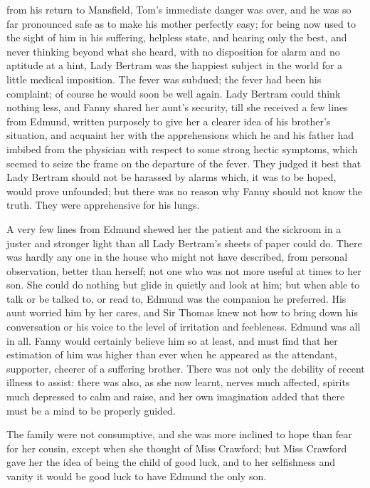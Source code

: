  from his return to Mansfield,
Tom's immediate danger was over, and he was so far
pronounced safe as to make his mother perfectly easy;
for being now used to the sight of him in his suffering,
helpless state, and hearing only the best, and never thinking
beyond what she heard, with no disposition for alarm
and no aptitude at a hint, Lady Bertram was the happiest
subject in the world for a little medical imposition.
The fever was subdued; the fever had been his complaint;
of course he would soon be well again.  Lady Bertram could
think nothing less, and Fanny shared her aunt's security,
till she received a few lines from Edmund, written purposely
to give her a clearer idea of his brother's situation,
and acquaint her with the apprehensions which he and his
father had imbibed from the physician with respect to some
strong hectic symptoms, which seemed to seize the frame
on the departure of the fever.  They judged it best
that Lady Bertram should not be harassed by alarms which,
it was to be hoped, would prove unfounded; but there was
no reason why Fanny should not know the truth.  They were
apprehensive for his lungs.

A very few lines from Edmund shewed her the patient
and the sickroom in a juster and stronger light than
all Lady Bertram's sheets of paper could do.  There was
hardly any one in the house who might not have described,
from personal observation, better than herself;
not one who was not more useful at times to her son.
She could do nothing but glide in quietly and look at him;
but when able to talk or be talked to, or read to,
Edmund was the companion he preferred.  His aunt worried
him by her cares, and Sir Thomas knew not how to bring down
his conversation or his voice to the level of irritation
and feebleness.  Edmund was all in all.  Fanny would
certainly believe him so at least, and must find that her
estimation of him was higher than ever when he appeared
as the attendant, supporter, cheerer of a suffering brother.
There was not only the debility of recent illness to assist:
there was also, as she now learnt, nerves much affected,
spirits much depressed to calm and raise, and her own
imagination added that there must be a mind to be
properly guided.

The family were not consumptive, and she was more inclined
to hope than fear for her cousin, except when she thought
of Miss Crawford; but Miss Crawford gave her the idea
of being the child of good luck, and to her selfishness
and vanity it would be good luck to have Edmund the only son.

